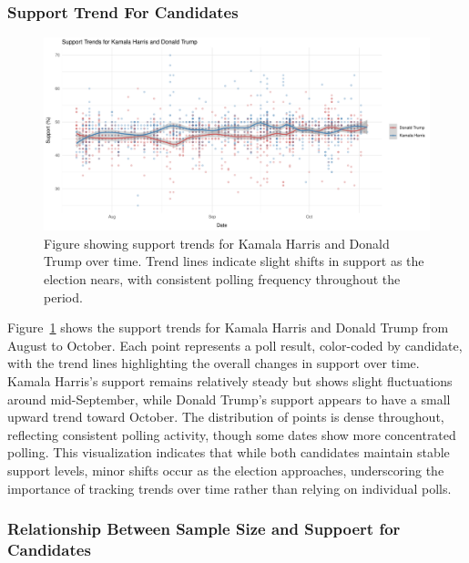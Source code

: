 \documentclass[
  letterpaper,
  DIV=11,
  numbers=noendperiod]{scrartcl}
\begin{document}
\newpage

\hypertarget{support-trend-for-candidates}{%
\subsubsection{Support Trend For
Candidates}\label{support-trend-for-candidates}}

\begin{figure}

{\centering \includegraphics{paper_files/figure-pdf/fig-trend-1.pdf}

}

\caption{\label{fig-trend}Figure showing support trends for Kamala
Harris and Donald Trump over time. Trend lines indicate slight shifts in
support as the election nears, with consistent polling frequency
throughout the period.}

\end{figure}

Figure~\ref{fig-trend} shows the support trends for Kamala Harris and
Donald Trump from August to October. Each point represents a poll
result, color-coded by candidate, with the trend lines highlighting the
overall changes in support over time. Kamala Harris's support remains
relatively steady but shows slight fluctuations around mid-September,
while Donald Trump's support appears to have a small upward trend toward
October. The distribution of points is dense throughout, reflecting
consistent polling activity, though some dates show more concentrated
polling. This visualization indicates that while both candidates
maintain stable support levels, minor shifts occur as the election
approaches, underscoring the importance of tracking trends over time
rather than relying on individual polls.

\newpage

\hypertarget{relationship-between-sample-size-and-suppoert-for-candidates}{%
\subsubsection{Relationship Between Sample Size and Suppoert for
Candidates}\label{relationship-between-sample-size-and-suppoert-for-candidates}}
\end{document}
